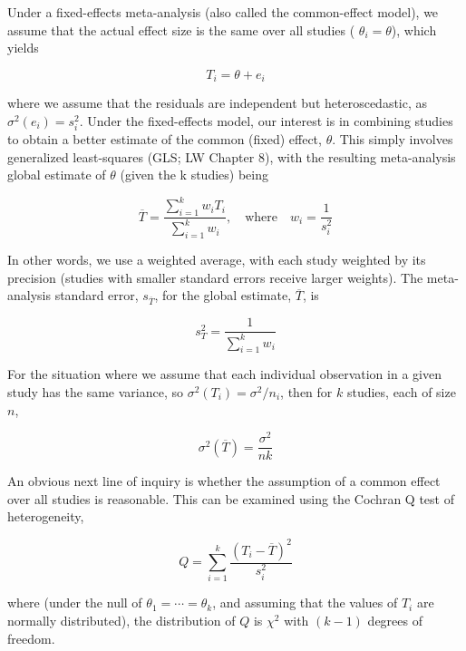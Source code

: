 \documentclass{article}
\begin{document}
Under a fixed-effects meta-analysis (also called the common-effect model), we assume that the actual effect size is the same over all studies ( $ \theta_i = \theta $), which yields

\begin{equation}
T_{i}=\theta+e_{i}
\end{equation}

where we assume that the residuals are independent but heteroscedastic, as  $ \sigma^{2}(e_{i}) = s_{i}^{2} $. Under the fixed-effects model, our interest is in combining studies to obtain a better estimate of the common (fixed) effect,  $ \theta $. This simply involves generalized least-squares (GLS; LW Chapter 8), with the resulting meta-analysis global estimate of  $ \theta $ (given the k studies) being

\begin{equation}
\overline{T}=\frac{\sum_{i=1}^{k}w_{i}T_{i}}{\sum_{i=1}^{k}w_{i}},\quad\mathrm{w h e r e}\quad w_{i}=\frac{1}{s_{i}^{2}}
\end{equation}

In other words, we use a weighted average, with each study weighted by its precision (studies with smaller standard errors receive larger weights). The meta-analysis standard error,  $ s_{\overline{T}} $, for the global estimate,  $ \overline{T} $, is

\begin{equation}
s_{T}^{2}=\frac{1}{\sum_{i=1}^{k}w_{i}}
\end{equation}

For the situation where we assume that each individual observation in a given study has the same variance, so  $ \sigma^2(T_i) = \sigma^2/n_i $, then for  $ k $ studies, each of size  $ n $,

\begin{equation}
\sigma^{2}(\overline{T})=\frac{\sigma^{2}}{nk}
\end{equation}

An obvious next line of inquiry is whether the assumption of a common effect over all studies is reasonable. This can be examined using the Cochran Q test of heterogeneity,

\begin{equation}
Q=\sum_{i=1}^{k}\frac{\left(T_{i}-\overline{T}\right)^{2}}{s_{i}^{2}}
\end{equation}

where (under the null of  $ \theta_1 = \cdots = \theta_k $, and assuming that the values of  $ T_i $ are normally distributed), the distribution of  $ Q $ is  $ \chi^2 $ with  $ (k-1) $ degrees of freedom.
\end{document}

